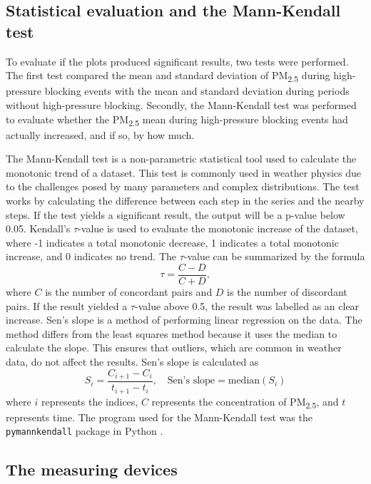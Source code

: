 \subsection{Statistical evaluation and the Mann-Kendall test}
To evaluate if the plots produced significant results, two tests were performed. The first test compared the mean and standard deviation of PM\textsubscript{2.5} during high-pressure blocking events with the mean and standard deviation during periods without high-pressure blocking. Secondly, the Mann-Kendall test was performed to evaluate whether the PM\textsubscript{2.5} mean during high-pressure blocking events had actually increased, and if so, by how much. 

The Mann-Kendall test is a non-parametric statistical tool used to calculate the monotonic trend of a dataset. This test is commonly used in weather physics due to the challenges posed by many parameters and complex distributions. The test works by calculating the difference between each step in the series and the nearby steps. If the test yields a significant result, the output will be a p-value below 0.05. Kendall's $\tau$-value is used to evaluate the monotonic increase of the dataset, where -1 indicates a total monotonic decrease, 1 indicates a total monotonic increase, and 0 indicates no trend. The $\tau$-value can be summarized by the formula 
\begin{equation}
    \tau = \frac{C - D}{C + D},
    \label{eq:Kendalltau}
\end{equation}
where $C$ is the number of concordant pairs and $D$ is the number of discordant pairs. If the result yielded a $\tau$-value above 0.5, the result was labelled as an clear increase. Sen's slope is a method of performing linear regression on the data. The method differs from the least squares method because it uses the median to calculate the slope. This ensures that outliers, which are common in weather data, do not affect the results. Sen's slope is calculated as 
\begin{equation}
    S_{i} = \frac{C_{i+1} - C_i}{t_{i+1} - t_i}, \quad \text{Sen's slope} = \text{median}(S_{i})
    \label{eq:Senslope}
\end{equation}
where $i$ represents the indices, $C$ represents the concentration of PM\textsubscript{2.5}, and $t$ represents time. The program used for the Mann-Kendall test was the \texttt{pymannkendall} package in Python \cite{hussainmd.andmahmudishtiakPyMannKendallPythonPackage2019}.


\subsection{The measuring devices}
